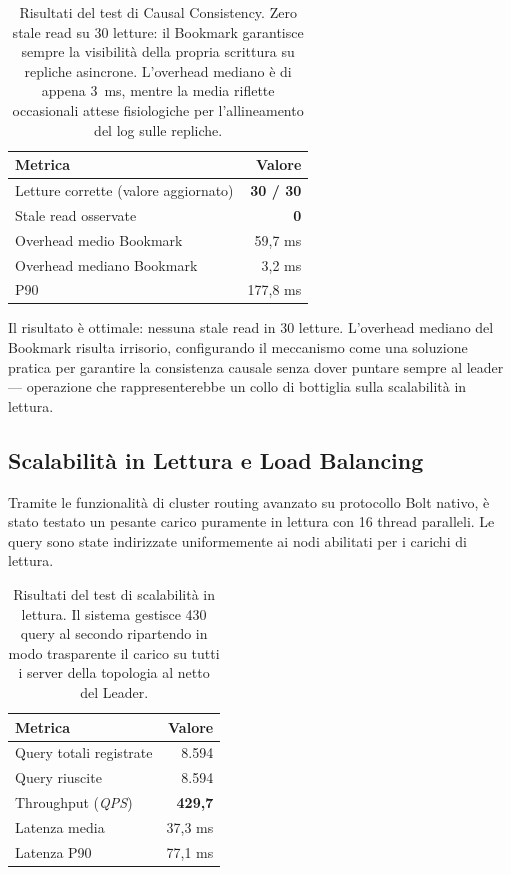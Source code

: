 \begin{table}[hbt!]
  \centering
  \begin{tabular}{lr}
    \hline
    \textbf{Metrica} & \textbf{Valore} \\
    \hline
    Letture corrette (valore aggiornato) & \textbf{30 / 30} \\
    Stale read osservate                 & \textbf{0} \\
    Overhead medio Bookmark              & 59,7 ms \\
    Overhead mediano Bookmark            & 3,2 ms \\
    P90                                  & 177,8 ms \\
    \hline
  \end{tabular}
  \caption{Risultati del test di Causal Consistency. Zero stale read su 30 letture: il Bookmark garantisce sempre la visibilità della propria scrittura su repliche asincrone. L'overhead mediano è di appena 3~ms, mentre la media riflette occasionali attese fisiologiche per l'allineamento del log sulle repliche.}
  \label{tab:causal_consistency}
\end{table}

Il risultato è ottimale: nessuna stale read in 30 letture. L'overhead mediano del Bookmark risulta irrisorio, configurando il meccanismo come una soluzione pratica per garantire la consistenza causale senza dover puntare sempre al leader — operazione che rappresenterebbe un collo di bottiglia sulla scalabilità in lettura.

\subsection{Scalabilità in Lettura e Load Balancing}
Tramite le funzionalità di cluster routing avanzato su protocollo Bolt nativo, è stato testato un pesante carico puramente in lettura con 16 thread paralleli. Le query sono state indirizzate uniformemente ai nodi abilitati per i carichi di lettura.

\begin{table}[hbt!]
  \centering
  \begin{tabular}{lr}
    \hline
    \textbf{Metrica} & \textbf{Valore} \\
    \hline
    Query totali registrate & 8.594 \\
    Query riuscite & 8.594 \\
    Throughput (\textit{QPS}) & \textbf{429,7} \\
    Latenza media & 37,3 ms \\
    Latenza P90 & 77,1 ms \\
    \hline
  \end{tabular}
  \caption{Risultati del test di scalabilità in lettura. Il sistema gestisce 430 query al secondo ripartendo in modo trasparente il carico su tutti i server della topologia al netto del Leader.}
  \label{tab:read_scalability}
\end{table}

